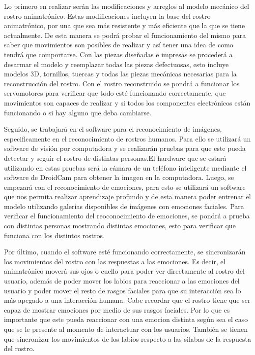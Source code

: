 Lo primero en realizar serán las modificaciones y arreglos al modelo mecánico del rostro animatrónico. Estas modificaciones incluyen la base del rostro animatrónico, por una que sea más resistente y más eficiente que la que se tiene actualmente. De esta manera se podrá probar el funcionamiento del mismo para saber que movimientos son posibles de realizar y así tener una idea de como tendrá que comportarse. Con las piezas diseñadas e impresas se procederá a desarmar el modelo y reemplazar todas las piezas defectuosas, esto incluye modelos 3D, tornillos, tuercas y todas las piezas mecánicas necesarias para la reconstrucción del rostro. Con el rostro reconstruido se pondrá a funcionar los servomotores para verificar que todo esté funcionando correctamente, que movimientos son capaces de realizar y si todos los componentes electrónicos están funcionando o si hay alguno que deba cambiarse.

Seguido, se trabajará en el software para el reconocimiento de imágenes, especificamente en el reconocimiento de rostros humanos. Para ello se utilizará un software de visión por computadora y se realizarán pruebas para que este pueda detectar y seguir el rostro de distintas personas.El hardware que se estará utilizando en estas pruebas será la cámara de un teléfono inteligente mediante el software de DroidCam para obtener la imagen en la computadora. Luego, se empezará con el reconocimiento de emociones, para esto se utilizará un software que nos permita realizar aprendizaje profundo y de esta manera poder entrenar el modelo utilizando galerias disponibles de imágenes con emociones faciales. Para verificar el funcionamiento del reoconocimiento de emociones, se pondrá a prueba con distintas personas mostrando distintas emociones, esto para verificar que funciona con los distintos rostros.

Por último, cuando el software esté funcionando correctamente, se sincronizarán los movimientos del rostro con las respuestas a las emociones. Es decir, el animatrónico moverá sus ojos o cuello para poder ver directamente al rostro del usuario, además de poder mover los labios para reaccionar a las emociones del usuario y poder mover el resto de rasgos faciales para que su interacción sea lo más apegado a una interacción humana. Cabe recordar que el rostro tiene que ser capaz de mostrar emociones por medio de sus rasgos faciales. Por lo que es importante que este pueda reaccionar con una emocion distinta según sea el caso que se le presente al momento de interactuar con los usuarios. También se tienen que sincronizar los movimientos de los labios respecto a las silabas de la respuesta del rostro.

